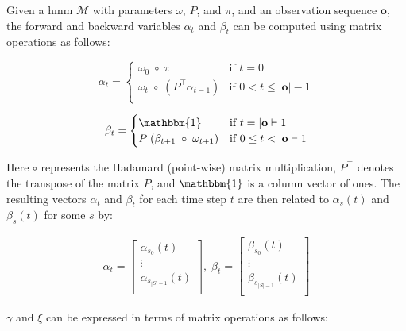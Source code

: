 Given a \gls{hmm} $\mathcal{M}$ with parameters $\omega$, $P$, and $\pi$, and an observation sequence $\mathbf{o}$, the forward and backward variables $\alpha_t$ and $\beta_t$ can be computed using matrix operations as follows:

\begin{equation}
    \label{eq:alpha}
    \alpha_t =
    \begin{cases}
        \omega_0 \; \circ \; \pi   & \text{if } t = 0    \\
        \omega_t \; \circ \; \left( {P}^\top \alpha_{t - 1} \right)   & \text{if } 0 < t \leq |\mathbf{o}|-1 \\
    \end{cases}
\end{equation}


\begin{equation}
    \label{eq:beta}
    {\beta}_t =
    \begin{cases}
        \mathbbm{1} & \text{if } t = |\mathbf{o}|-1        \\
        {P} \; ({\beta}_{t + 1} \; \circ \; {\omega}_{t + 1}) & \text{if } 0 \leq t < |\mathbf{o}|-1 \\
    \end{cases}
\end{equation}

Here $\circ$ represents the Hadamard (point-wise) matrix multiplication, ${P}^\top$ denotes the transpose of the matrix ${P}$, and $\mathbbm{1}$ is a column vector of ones.
The resulting vectors ${\alpha}_t$ and ${\beta}_t$ for each time step $t$ are then related to $\alpha_s(t)$ and $\beta_s(t)$ for some $s$ by:

\begin{align}
    {\alpha}_t = \begin{bmatrix}
        \alpha_{s_0}(t)       \\
        \vdots                \\
        \alpha_{s_{|S|-1}}(t) \\
    \end{bmatrix}, \;
    {\beta}_t = \begin{bmatrix}
        \beta_{s_0}(t)       \\
        \vdots               \\
        \beta_{s_{|S|-1}}(t) \\
    \end{bmatrix}
\end{align}

$\gamma$ and $\xi$ can be expressed in terms of matrix operations as follows:

